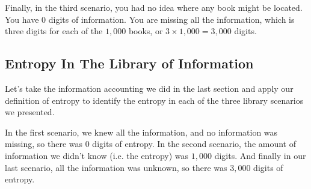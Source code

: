 \documentclass[11pt, oneside]{article}   	%
\begin{document}
Finally, in the third scenario, you had no idea where any book might be located.
You have $0$ digits of information.  You are missing all the information, which
is three digits for each of the $1,000$ books, or $3\times1,000=3,000$ digits.

\subsection{Entropy In The Library of Information}
Let's take the information accounting we did in the last section and apply our
definition of entropy to identify the entropy in each of the three library
scenarios we presented.

In the first scenario, we knew all the information, and no information was
missing, so there was $0$ digits of entropy.  In the second scenario, the amount
of information we didn't know (i.e. the entropy) was $1,000$ digits.  And
finally in our last scenario, all the information was unknown, so there was
$3,000$ digits of entropy.
\end{document}
